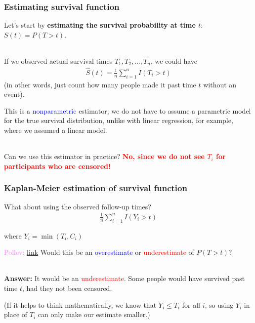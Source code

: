 \documentclass[10pt,t]{beamer}
\begin{document}
\begin{frame}
\frametitle{Estimating survival function}

\vspace{-5 mm}

Let's start by \textbf{estimating the survival probability at time $t$}: $S(t) = P(T > t)$.
\\ ~\ 

If we observed actual survival times $T_1, T_2, \dots, T_n$, we could have
\begin{align*}
\widehat{S}(t)=\frac{1}{n}\sum_{i=1}^n I(T_i > t)
\end{align*}
 (in other words, just count how many people made it past time $t$ without an event). 
 
 \medskip
 
 This is a \textcolor{blue}{nonparametric} estimator; we do not have to assume a parametric model for the true survival distribution, unlike with linear regression, for example, where we assumed a linear model. 
\\ ~\ 

Can we use this estimator in practice?   \textbf{\textcolor{red}{No, since we do not see $T_i$ for participants who are censored!}}
\end{frame}

\begin{frame}
\frametitle{Kaplan-Meier estimation of survival function}
	What about using the observed follow-up times?
	\begin{align*}
		\frac{1}{n}\sum_{i=1}^{n}I(Y_i > t)
	\end{align*}
	
	where $Y_i = \min(T_i,C_i)$
	
	\bigskip
	
	\textcolor{violet}{Pollev: \href{https://PollEv.com/multiple_choice_polls/buQTHdd72xMJq25jNb3Y3/respond}{link}} Would this be an \textcolor{blue}{overestimate} or \textcolor{red}{underestimate} of $P(T > t)$?  \pause 
	\\ ~\ 
	
	\textbf{Answer:} It would be an \textcolor{red}{underestimate}. Some people would have survived past time $t$, had they not been censored. 
	
	\medskip
	
	(If it helps to think mathematically, we know that $Y_i \leq T_i$ for all $i$, so using $Y_i$ in place of $T_i$ can only make our estimate smaller.)
\end{frame}
\end{document}
